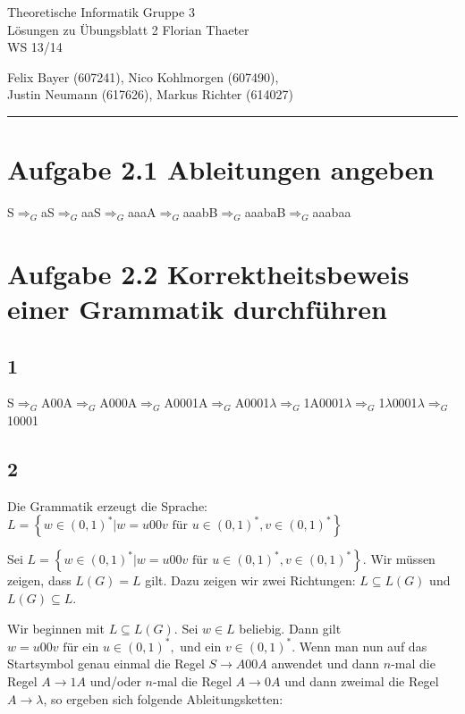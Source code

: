 \documentclass[a4paper, fontsize=10pt]{scrartcl}
\begin{document}
 

{\large Theoretische Informatik \hfill Gruppe 3}\\  
{\large Lösungen zu Übungsblatt 2} \hfill Florian Thaeter\\
{\large WS 13/14}
\begin{flushright}Felix Bayer (607241), Nico Kohlmorgen (607490),\\ Justin Neumann (617626), Markus Richter (614027)\end{flushright}
\rule{\textwidth}{.3mm}

\section*{Aufgabe 2.1 Ableitungen angeben}
S$\Rightarrow _G$aS$\Rightarrow _G$aaS$\Rightarrow _G$aaaA$\Rightarrow _G$aaabB$\Rightarrow _G$aaabaB$\Rightarrow _G$aaabaa

\section*{Aufgabe 2.2 Korrektheitsbeweis einer Grammatik durchführen}
\subsection*{1}
S$\Rightarrow _G$A00A$\Rightarrow _G$A000A$\Rightarrow _G$A0001A$\Rightarrow _G$A0001$\lambda\Rightarrow _G$1A0001$\lambda\Rightarrow _G$1$\lambda$0001$\lambda\Rightarrow _G$10001

\newpage

\subsection*{2}
Die Grammatik erzeugt die Sprache:\\
$L=\left\{w\in(0,1)^*\rvert w=u00v \textrm{ für }u\in (0,1)^*, v\in (0,1)^*\right\}$\bigskip

Sei $L=\left\{w\in(0,1)^*\rvert w=u00v \textrm{ für }u\in (0,1)^*, v\in (0,1)^*\right\}$. Wir müssen zeigen, dass $L(G)=L$ gilt. Dazu zeigen wir zwei Richtungen: $L\subseteq L(G)$ und $L(G)\subseteq  L$.\bigskip

Wir beginnen mit $L\subseteq L(G)$. Sei $w\in L$ beliebig. Dann gilt\\$w=u00v \textrm{ für ein }u\in (0,1)^*, \textrm{ und ein }v\in(0,1)^*$. Wenn man nun auf das Startsymbol genau einmal die Regel $S\rightarrow A00A$ anwendet und dann $n$-mal die Regel $A\rightarrow 1A$ und/oder $n$-mal die Regel $A\rightarrow0A$ und dann zweimal die Regel $A\rightarrow\lambda$, so ergeben sich folgende Ableitungsketten:\bigskip
\end{document}
